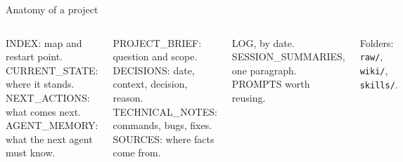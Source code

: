 \begin{frame}{Anatomy of a project}
  \begin{columns}[T,onlytextwidth]
      {\footnotesize INDEX: map and restart point.\\
      CURRENT\_STATE: where it stands.\\
      NEXT\_ACTIONS: what comes next.\\
      AGENT\_MEMORY: what the next agent must know.\par}
      \vspace{0.12em}
      {\footnotesize PROJECT\_BRIEF: question and scope.\\
      DECISIONS: date, context, decision, reason.\\
      TECHNICAL\_NOTES: commands, bugs, fixes.\\
      SOURCES: where facts come from.\par}
      \vspace{0.12em}
      {\footnotesize LOG, by date. SESSION\_SUMMARIES, one paragraph. PROMPTS worth reusing.\par}
      {\scriptsize\color{muted} Folders: \texttt{raw/}, \texttt{wiki/}, \texttt{skills/}.\par}
  \end{columns}
\end{frame}

